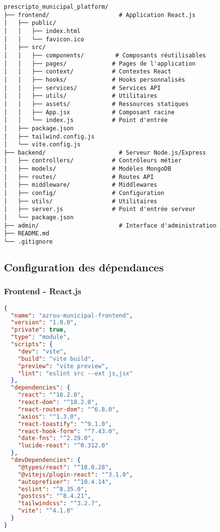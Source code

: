 \begin{lstlisting}[caption=Structure complète du projet]
prescripto_municipal_platform/
├── frontend/                    # Application React.js
│   ├── public/
│   │   ├── index.html
│   │   └── favicon.ico
│   ├── src/
│   │   ├── components/         # Composants réutilisables
│   │   ├── pages/             # Pages de l'application
│   │   ├── context/           # Contextes React
│   │   ├── hooks/             # Hooks personnalisés
│   │   ├── services/          # Services API
│   │   ├── utils/             # Utilitaires
│   │   ├── assets/            # Ressources statiques
│   │   ├── App.jsx            # Composant racine
│   │   └── index.js           # Point d'entrée
│   ├── package.json
│   ├── tailwind.config.js
│   └── vite.config.js
├── backend/                     # Serveur Node.js/Express
│   ├── controllers/           # Contrôleurs métier
│   ├── models/                # Modèles MongoDB
│   ├── routes/                # Routes API
│   ├── middleware/            # Middlewares
│   ├── config/                # Configuration
│   ├── utils/                 # Utilitaires
│   ├── server.js              # Point d'entrée serveur
│   └── package.json
├── admin/                       # Interface d'administration
├── README.md
└── .gitignore
\end{lstlisting}

\subsection{Configuration des dépendances}

\subsubsection{Frontend - React.js}

\begin{lstlisting}[language=JSON, caption=Package.json Frontend]
{
  "name": "azrou-municipal-frontend",
  "version": "1.0.0",
  "private": true,
  "type": "module",
  "scripts": {
    "dev": "vite",
    "build": "vite build",
    "preview": "vite preview",
    "lint": "eslint src --ext js,jsx"
  },
  "dependencies": {
    "react": "^18.2.0",
    "react-dom": "^18.2.0",
    "react-router-dom": "^6.8.0",
    "axios": "^1.3.0",
    "react-toastify": "^9.1.0",
    "react-hook-form": "^7.43.0",
    "date-fns": "^2.29.0",
    "lucide-react": "^0.312.0"
  },
  "devDependencies": {
    "@types/react": "^18.0.28",
    "@vitejs/plugin-react": "^3.1.0",
    "autoprefixer": "^10.4.14",
    "eslint": "^8.35.0",
    "postcss": "^8.4.21",
    "tailwindcss": "^3.2.7",
    "vite": "^4.1.0"
  }
}
\end{lstlisting}

